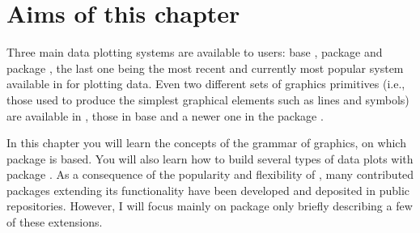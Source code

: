 \documentclass[krantz2]{krantz}\usepackage{knitr}
\begin{document}


\section{Aims of this chapter}

Three main data plotting systems are available to \Rlang users: base \Rlang, package  \autocite{Sarkar2008} and package  \autocite{Wickham2016}, the last one being the most recent and currently most popular system available in \Rlang for plotting data. Even two different sets of graphics primitives (i.e., those used to produce the simplest graphical elements such as lines and symbols) are available in \Rlang, those in base \Rlang and a newer one in the  package \autocite{Murrell2011}.

In this chapter you will learn the concepts of the grammar of graphics, on which package  is based. You will also learn how to build several types of data plots with package . As a consequence of the popularity and flexibility of , many contributed packages extending its functionality have been developed and deposited in public repositories. However, I will focus mainly on package  only briefly describing a few of these extensions.
\end{document}
